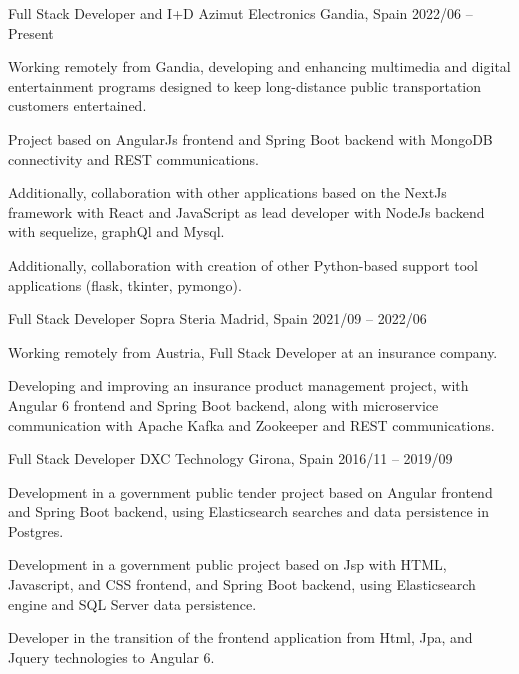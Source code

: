 \documentclass[]{awesome-cv}
\begin{document}
\begin{cventries}
	\cventry
	{Full Stack Developer and I+D}
	{Azimut Electronics}
	{Gandia, Spain}
	{2022/06 – Present}
	{\begin{cvitems}
		\vspace{0.5mm}
		\item {Working remotely from Gandia, developing and enhancing multimedia and digital entertainment programs designed to keep long-distance public transportation customers entertained.}
		\item {Project based on AngularJs frontend and Spring Boot backend with MongoDB connectivity and REST communications.}
        \item {Additionally, collaboration with other applications based on the NextJs framework with React and JavaScript as lead developer with NodeJs backend with sequelize, graphQl and Mysql.}
        \item {Additionally, collaboration with creation of other Python-based support tool applications (flask, tkinter, pymongo).}
		\end{cvitems}}

	\cventry
	{Full Stack Developer}
	{Sopra Steria}
	{Madrid, Spain}
	{2021/09 – 2022/06}
	{\begin{cvitems}
		\vspace{0.5mm}
		\item {Working remotely from Austria, Full Stack Developer at an insurance company.}
		\item {Developing and improving an insurance product management project, with Angular 6 frontend and Spring Boot backend, along with microservice communication with Apache Kafka and Zookeeper and REST communications.}
		\end{cvitems}}

	\cventry
	{Full Stack Developer}
	{DXC Technology}
	{Girona, Spain}
	{2016/11 – 2019/09}
	{\begin{cvitems}
		\vspace{0.5mm}
		\item {Development in a government public tender project based on Angular frontend and Spring Boot backend, using Elasticsearch searches and data persistence in Postgres.}
  \item {Development in a government public project based on Jsp with HTML, Javascript, and CSS frontend, and Spring Boot backend, using Elasticsearch engine and SQL Server data persistence.}
  \item {Developer in the transition of the frontend application from Html, Jpa, and Jquery technologies to Angular 6.}
		\end{cvitems}}


\end{cventries}
\end{document}
